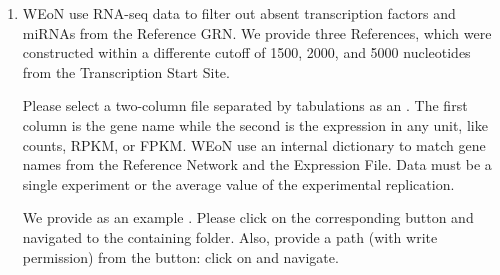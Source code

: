 \documentclass[letterpaper,10pt,english]{sphinxmanual}
\begin{document}
\begin{enumerate}
\def\theenumi{\arabic{enumi}}
\def\labelenumi{\theenumi .}
\makeatletter\def\p@enumii{\p@enumi \theenumi .}\makeatother
\setcounter{enumi}{1}
\item {} 

WEoN use RNA-seq data to filter out absent transcription factors and miRNAs
from the Reference GRN. We provide three References,
which were constructed within a differente cutoff of 1500, 2000, and 5000
nucleotides from the Transcription Start Site.

Please select a two-column file separated by tabulations as an .
The first column is the gene name while the second is the expression in any
unit, like counts, RPKM, or FPKM. WEoN use an internal dictionary to match gene
names from the Reference Network and the Expression File. Data must be a single
experiment or the average value of the experimental replication.

We provide  as an example . Please
click on the corresponding  button and navigated to the containing
folder. Also, provide a path (with write permission) from the 
button: click on and navigate.

\end{enumerate}
\end{document}
